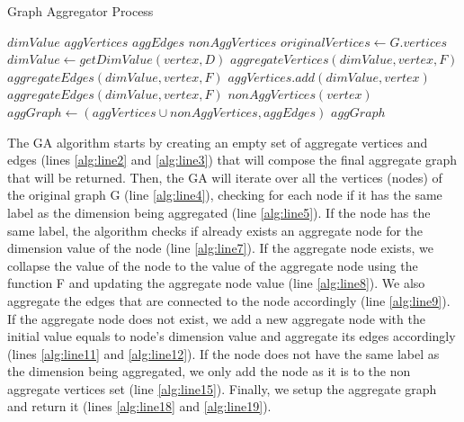\begin{algorithm}[!h]
 \caption{Graph Aggregator Process}\label{alg:algorithm1}
  \begin{algorithmic}[1]
      \State $dimValue$ 
      \State $aggVertices$   \label{alg:line2}
      \State $aggEdges$  \label{alg:line3} 
      \State $nonAggVertices$   \label{alg:line31} 
      \State $originalVertices \gets G.vertices$  \label{alg:line32}
        \label{alg:line4}
          \label{alg:line5}
          \State $dimValue \gets getDimValue(vertex, D)$
             \label{alg:line7}
             \State $aggregateVertices(dimValue, vertex, F)$  \label{alg:line8}
             \State $aggregateEdges(dimValue, vertex, F)$  \label{alg:line9}
           \Else
              \State $aggVertices.add(dimValue, vertex)$  \label{alg:line11}
              \State $aggregateEdges(dimValue, vertex, F)$  \label{alg:line12}
           \EndIf
       \Else 
          \State $nonAggVertices(vertex)$   \label{alg:line15}
        \EndIf
      \EndFor
      \State $aggGraph \gets (aggVertices \cup nonAggVertices, aggEdges)$  \label{alg:line18}
      \State \Return $aggGraph$  \label{alg:line19}
    \EndFunction
  \end{algorithmic}
\end{algorithm}

The GA algorithm starts by creating an empty set of aggregate vertices and edges (lines \ref{alg:line2} and \ref{alg:line3}) that will compose the final aggregate graph that will be returned. Then, the GA will iterate over all the vertices (nodes) of the original graph G (line \ref{alg:line4}), checking for each node if it has the same label as the dimension being aggregated (line \ref{alg:line5}). If the node has the same label, the algorithm checks if already exists an aggregate node for the dimension value of the node (line \ref{alg:line7}). If the aggregate node exists, we collapse the value of the node to the value of the aggregate node using the function F and updating the aggregate node value (line \ref{alg:line8}). We also aggregate the edges that are connected to the node accordingly (line \ref{alg:line9}). If the aggregate node does not exist, we add a new aggregate node with the initial value equals to node's dimension value and aggregate its edges accordingly (lines \ref{alg:line11} and \ref{alg:line12}). If the node does not have the same label as the dimension being aggregated, we only add the node as it is to the non aggregate vertices set (line \ref{alg:line15}). Finally, we setup the aggregate graph and return it (lines \ref{alg:line18} and \ref{alg:line19}).

